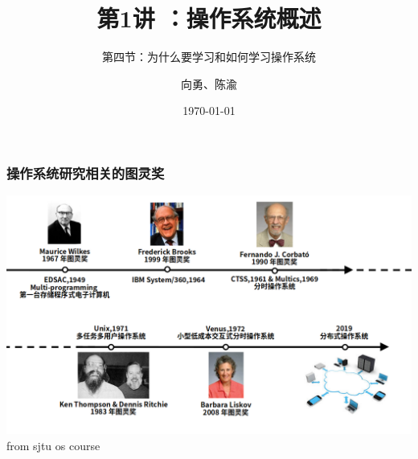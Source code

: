 \documentclass[UTF8]{ctexbeamer}
\title[第1讲]{第1讲 ：操作系统概述} %
\subtitle{第四节：为什么要学习和如何学习操作系统}
\author{向勇、陈渝} %
\institute[清华大学] %
{
清华大学计算机系 \\ %
\medskip
\textit{xyong,yuchen@tsinghua.edu.cn} %
}
\date{\today} %
\begin{document}
\begin{frame}
\titlepage %
\end{frame}

%
%

\begin{frame}
    \frametitle{操作系统研究相关的图灵奖}
     \includegraphics[width=1.0\linewidth]{turing-os}
     from sjtu os course
\end{frame}
\end{document}
